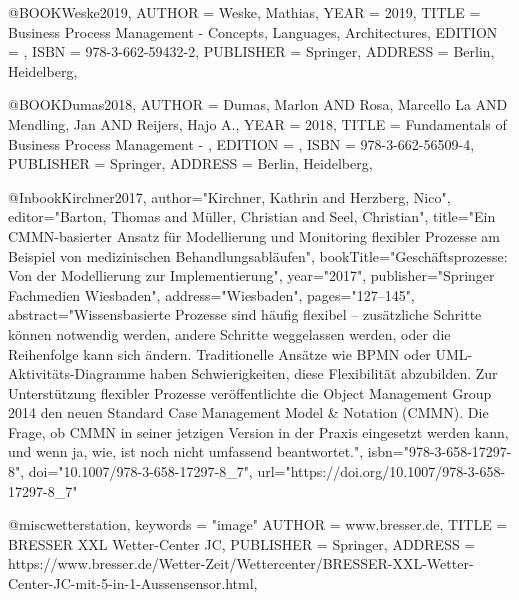 @BOOK{Weske2019,
	AUTHOR = {Weske, Mathias},
	YEAR = {2019},
	TITLE = {Business Process Management - Concepts, Languages, Architectures},
	EDITION = {},
	ISBN = {978-3-662-59432-2},
	PUBLISHER = {Springer},
	ADDRESS = {Berlin, Heidelberg},
}

@BOOK{Dumas2018,
	AUTHOR = {Dumas, Marlon AND Rosa, Marcello La AND Mendling, Jan AND Reijers, Hajo A.},
	YEAR = {2018},
	TITLE = {Fundamentals of Business Process Management - },
	EDITION = {},
	ISBN = {978-3-662-56509-4},
	PUBLISHER = {Springer},
	ADDRESS = {Berlin, Heidelberg},
}

@Inbook{Kirchner2017,
author="Kirchner, Kathrin
and Herzberg, Nico",
editor="Barton, Thomas
and M{\"u}ller, Christian
and Seel, Christian",
title="Ein CMMN-basierter Ansatz f{\"u}r Modellierung und Monitoring flexibler Prozesse am Beispiel von medizinischen Behandlungsabl{\"a}ufen",
bookTitle="Gesch{\"a}ftsprozesse: Von der Modellierung zur Implementierung",
year="2017",
publisher="Springer Fachmedien Wiesbaden",
address="Wiesbaden",
pages="127--145",
abstract="Wissensbasierte Prozesse sind h{\"a}ufig flexibel -- zus{\"a}tzliche Schritte k{\"o}nnen notwendig werden, andere Schritte weggelassen werden, oder die Reihenfolge kann sich {\"a}ndern. Traditionelle Ans{\"a}tze wie BPMN oder UML-Aktivit{\"a}ts-Diagramme haben Schwierigkeiten, diese Flexibilit{\"a}t abzubilden. Zur Unterst{\"u}tzung flexibler Prozesse ver{\"o}ffentlichte die Object Management Group 2014 den neuen Standard Case Management Model {\&} Notation (CMMN). Die Frage, ob CMMN in seiner jetzigen Version in der Praxis eingesetzt werden kann, und wenn ja, wie, ist noch nicht umfassend beantwortet.",
isbn="978-3-658-17297-8",
doi="10.1007/978-3-658-17297-8_7",
url="https://doi.org/10.1007/978-3-658-17297-8_7"
}

@misc{wetterstation,
	keywords = "image"
	AUTHOR = {www.bresser.de},
	TITLE = {BRESSER XXL Wetter-Center JC},
	PUBLISHER = {Springer},
	ADDRESS = {https://www.bresser.de/Wetter-Zeit/Wettercenter/BRESSER-XXL-Wetter-Center-JC-mit-5-in-1-Aussensensor.html},
}

